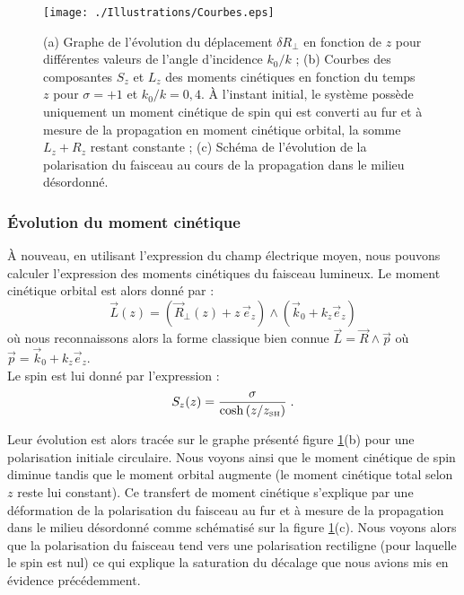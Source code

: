 \documentclass[a4paper,11pt]{article} %
\begin{document}
	
	\begin{figure}[h]
		\centering
		\begin{minipage}[c]{0.85\linewidth}
			\centering
			\texttt{[image: ./Illustrations/Courbes.eps]}
			\caption{(a) Graphe de l'évolution du déplacement $ \delta R_\perp $ en fonction de $ z $ pour différentes valeurs de l'angle d'incidence $k_0/k $ ; (b) Courbes des composantes $ S_z $ et $ L_z $ des moments cinétiques en fonction du temps $ z $ pour $ \sigma = + 1 $ et $ k_0 / k = 0,4 $. \`{A} l'instant initial, le système possède uniquement un moment cinétique de spin qui est converti au fur et à mesure de la propagation en moment cinétique orbital, la somme $ L_z + R_z $ restant constante ; (c) Schéma de l'évolution de la polarisation du faisceau au cours de la propagation dans le milieu désordonné.}
			\label{fig:Plot}
		\end{minipage}
	\end{figure}
	
	\subsubsection{\'Evolution du moment cinétique}
	\`A nouveau, en utilisant l'expression du champ électrique moyen, nous pouvons calculer l'expression des moments cinétiques du faisceau lumineux. Le moment cinétique orbital est alors donné par :
	\begin{equation*}
		\label{exp_L(z)}
		\vec{L}(z) = \left(\vec{R}_\perp(z) + z \, \vec{e}_z \right) \wedge ( \vec{k}_0 + k_z \vec{e}_z ) 
	\end{equation*}
	où nous reconnaissons alors la forme classique bien connue $ \vec{L} = \vec{R} \wedge \vec{p} $ où $ \vec{p} = \vec{k}_0 + k_z \vec{e}_z $.\\
	
	Le spin est lui donné par l'expression :
	\begin{equation}
		\label{exp_S(z)}
		S_z(z) =  \frac{ \sigma}{ \cosh \left( z/z_\text{{\tiny SH}} \right) } \; .
	\end{equation}
	
	Leur évolution est alors tracée sur le graphe présenté figure \ref{fig:Plot}(b) pour une polarisation initiale circulaire. Nous voyons ainsi que le moment cinétique de spin diminue tandis que le moment orbital augmente (le moment cinétique total selon $ z $ reste lui constant). Ce transfert de moment cinétique s'explique par une déformation de la polarisation du faisceau au fur et à mesure de la propagation dans le milieu désordonné comme schématisé sur la figure \ref{fig:Plot}(c). Nous voyons alors que la polarisation du faisceau tend vers une polarisation rectiligne (pour laquelle le spin est nul) ce qui explique la saturation du décalage que nous avions mis en évidence précédemment.
	
\end{document}
